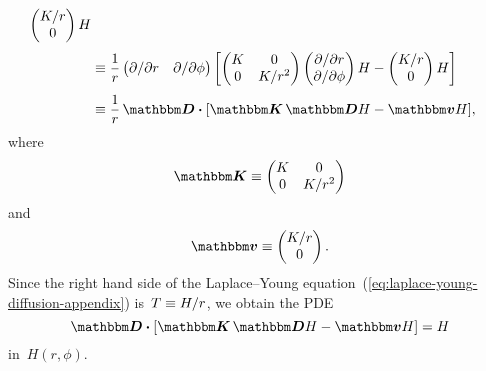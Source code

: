 \begin{align*}
{\begin{pmatrix}
        K / r \\
        0
      \end{pmatrix}
      H
    }
    \\[\tallspace]
  &\ideq
    \frac{1}{r}
    \begin{pmatrix}
      \pd / {\pd r} & \pd / {\pd\phi}
    \end{pmatrix}
    \squarebr*{
      \begin{pmatrix}
        K  &  0 \\
        0  &  K / r^2
      \end{pmatrix}
      \begin{pmatrix}
        \pd / {\pd r} \\
        \pd / {\pd\phi}
      \end{pmatrix}
      H
        -
      \begin{pmatrix}
        K / r \\
        0
      \end{pmatrix}
      H
    }
    \\[\tallspace]
  &\ideq
    \frac{1}{r}
    \matder \dotp \squarebr[\bulkysize]{\mat{K} \matder H - \mat{v} H},
\end{align*}
where
\begin{equation}
  \mat{K} \ideq
    \begin{pmatrix}
      K  &  0 \\
      0  &  K / r^2
    \end{pmatrix}
  \label{eq:small-formally-rectangular-diffusion-coefficient-singular}
\end{equation}
and
\begin{equation}
  \mat{v} \ideq
    \begin{pmatrix}
      K / r \\
      0
    \end{pmatrix}.
    \label{eq:small-formally-rectangular-convection-coefficient-singular}
\end{equation}
Since the right hand side
of the Laplace--Young equation~(\ref{eq:laplace-young-diffusion-appendix})
is~$T \equiv H / r$,
we obtain the PDE
\begin{equation}
  \matder \dotp \squarebr[\bulkysize]{\mat{K} \matder H - \mat{v} H}
    = H
  \label{eq:small-formally-rectangular-laplace-young-appendix}
\end{equation}
in~$H (r, \phi)$.
